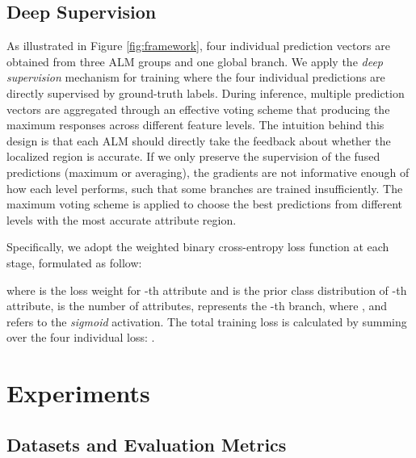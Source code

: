 \documentclass[10pt,twocolumn,letterpaper]{article}
\begin{document}
\subsection{Deep Supervision} \label{sec:deepsupervision}
As illustrated in Figure \ref{fig:framework}, four individual prediction vectors are obtained from three ALM groups and one global branch.
We apply the \textit{deep supervision} \cite{lee2015deeply,wang2018resource} mechanism for training where the four individual predictions are directly supervised by ground-truth labels.
During inference, multiple prediction vectors are aggregated through an effective voting scheme that producing the maximum responses across different feature levels.
The intuition behind this design is that each ALM should directly take the feedback about whether the localized region is accurate.
If we only preserve the supervision of the fused predictions (maximum or averaging), the gradients are not informative enough of how each level performs, such that some branches are trained insufficiently.
The maximum voting scheme is applied to choose the best predictions from different levels with the most accurate attribute region.

Specifically, we adopt the weighted binary cross-entropy loss function \cite{deepmar} at each stage, formulated as follow:

where  is the loss weight for -th attribute and  is the prior class distribution of -th attribute,
 is the number of attributes,
 represents the -th branch, where ,
and  refers to the \textit{sigmoid} activation.
The total training loss is calculated by summing over the four individual loss: .


\section{Experiments}

\subsection{Datasets and Evaluation Metrics}
\end{document}
